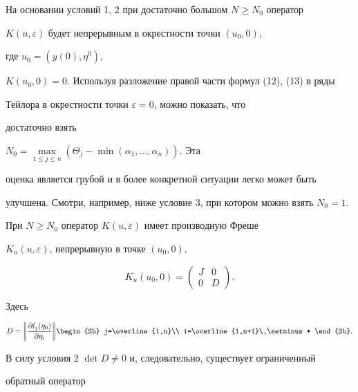 На основании условий 1, 2 при достаточно большом $N \ge N_0$  оператор


$K(u,\varepsilon)$ будет непрерывным в окрестности точки $(u_0,0)$,


где $u_0 = (y(0),\eta^0)$, 


$K(u_0,0) = 0$. Используя разложение правой части формул (12), (13) в ряды


Тейлора в окрестности точки $\varepsilon = 0$, можно показать, что


достаточно взять


$N_0 = \max\limits_{1\le j\le n}(\Theta_j


- \min(\alpha_1,\dotsc,\alpha_n))$. Эта


оценка является грубой и в более конкретной ситуации легко может быть


улучшена. Смотри, например, ниже условие 3, при котором можно взять $N_0 =


1$.





При $N\ge N_0$ оператор $K(u,\varepsilon)$ имеет производную Фреше


$K_u(u,\varepsilon)$, непрерывную в точке $(u_0,0)$,


$$


K_u(u_0,0) =


\begin{pmatrix}


J & 0 \\


0 & D


\end{pmatrix}.


$$


Здесь


$$


D = \bigg\|\frac{\partial l_j(\eta_0)}{\partial\eta_i}\bigg\|


\begin{Sb}


j=\overline{1,n}\\


i=\overline{1,n+1}\,\setminus *


\end{Sb}.


$$





В силу условия 2\; $\det D\ne 0$ и, следовательно, существует ограниченный


обратный оператор


